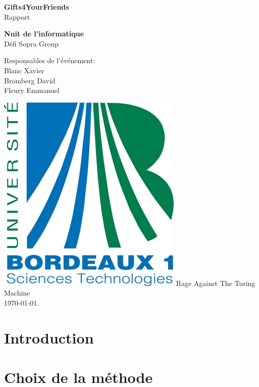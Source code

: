 \documentclass[a4paper,francais,titlepage]{report}
\begin{document}
\pagestyle{fancy}

\begin{titlepage}
 \begin{center}
	\vspace*{3.5cm}
	\Large \textbf{Gifts4YourFriends} \\
	\vspace{0.2cm}
	\small Rapport
	\vspace{2cm}

	\huge \textbf{Nuit de l'informatique} \\
	\vspace{0.3cm}
	\large {Défi Sopra Group}
	\vspace{1.5cm}
 \end{center}
 
 \begin{flushleft}
	\normalsize {\hspace{6cm}Responsables de l'événement: \\ 
				 \hspace{7.0cm} Blanc Xavier \\
				 \hspace{6.7cm} Bromberg David \\
				 \hspace{6.6cm} Fleury Emmanuel}
	\vspace{2cm}
 \end{flushleft}
 
   \begin{center}
   \includegraphics[scale=0.3]{logo_bx1.jpg}
   	\vfill 
   	\vspace{2cm}
	\normalsize {Rage Against The Turing Machine\\}
	\vspace{1.5cm} 
	{\today}.
 \end{center}
\end{titlepage}

\section{Introduction}

\section{Choix de la méthode}
\end{document}
